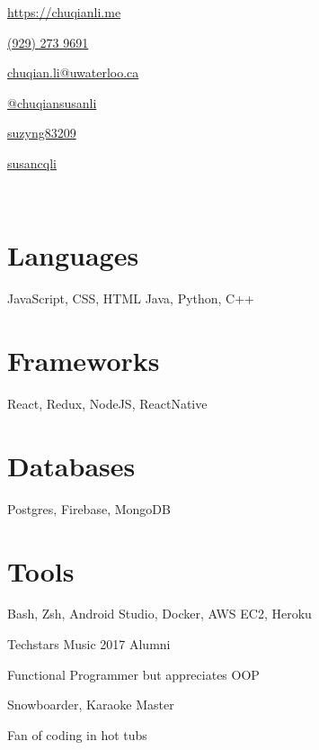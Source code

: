 \documentclass[]{friggeri-cv}
\begin{document}
       {\href{http://chuqianli.me}{https://chuqianli.me}}


\begin{aside}
  \begin{description}\raggedleft
	  \item \href{tel:19292739691}{(929) 273 9691 \faPhone}
	  \item \href{mailto:chuqian.li@edu.uwaterloo.ca}{chuqian.li@uwaterloo.ca \faEnvelopeO}
	  \item \href{https://medium.com/@chuqiansusanli}{@chuqiansusanli \faMedium}
	  \item \href{https://github.com/suzyng83209}{suzyng83209 \faGithub}
	  \item \href{https://www.linkedin.com/in/susancqli}{susancqli \faLinkedin}
  \end{description}
  \
  \supersection{}
  \
  \supersection{}
  \
  \section{Languages}
  JavaScript, CSS, HTML
  Java, Python, C++
  \section{Frameworks}
  React, Redux, NodeJS, ReactNative
  \section{Databases}
  Postgres, Firebase, MongoDB
  \section{Tools}
  Bash, Zsh, Android Studio, Docker, AWS EC2, Heroku
  \
  \supersection{}
  \
  \supersection{}
  \
  \begin{description}\raggedleft
  	\item Techstars Music 2017 Alumni
  	\item Functional Programmer but appreciates OOP
  	\item Snowboarder, Karaoke Master
  	\item Fan of coding in hot tubs
  \end{description}
\end{aside}
\end{document}
